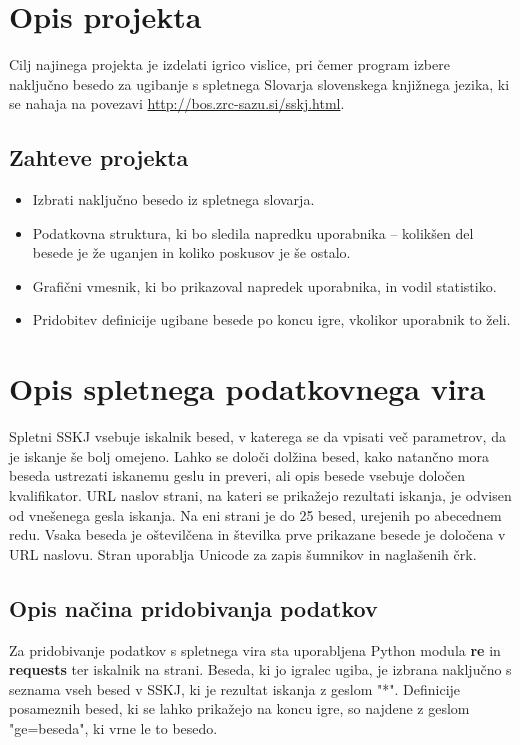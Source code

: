 \documentclass [a4paper, 12pt] {article}
\begin{document}
\section {Opis projekta}
Cilj najinega projekta je izdelati igrico vislice, pri čemer program izbere naključno besedo za ugibanje s spletnega Slovarja slovenskega knjižnega jezika, ki se nahaja na povezavi \url {http://bos.zrc-sazu.si/sskj.html}.
\subsection {Zahteve projekta}
\begin {itemize}
\item Izbrati naključno besedo iz spletnega slovarja.
\item Podatkovna struktura, ki bo sledila napredku uporabnika -- kolikšen del besede je že uganjen in koliko poskusov je še ostalo.
\item Grafični vmesnik, ki bo prikazoval napredek uporabnika, in vodil statistiko.
\item  Pridobitev definicije ugibane besede po koncu igre, vkolikor uporabnik to želi.
\end {itemize}

\section {Opis spletnega podatkovnega vira}
Spletni SSKJ vsebuje iskalnik besed, v katerega se da vpisati več parametrov, da je iskanje še bolj omejeno. Lahko se določi dolžina besed, kako natančno mora beseda ustrezati iskanemu geslu in preveri, ali opis besede vsebuje določen kvalifikator. URL naslov strani, na kateri se prikažejo rezultati iskanja, je odvisen od vnešenega gesla iskanja. Na eni strani je do 25 besed, urejenih po abecednem redu. Vsaka beseda je oštevilčena in številka prve prikazane besede je določena v URL naslovu. Stran uporablja Unicode za zapis šumnikov in naglašenih črk.
\subsection {Opis načina pridobivanja podatkov}
Za pridobivanje podatkov s spletnega vira sta uporabljena Python modula \textbf {re} in \textbf {requests} ter iskalnik na strani. Beseda, ki jo igralec ugiba, je izbrana naključno s seznama vseh besed v SSKJ, ki je rezultat iskanja z geslom "*". Definicije posameznih besed, ki se lahko prikažejo na koncu igre, so najdene z geslom "ge=beseda", ki vrne le to besedo.
\end{document}
